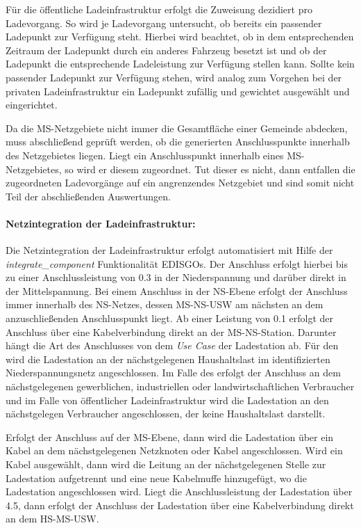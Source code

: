 Für die öffentliche Ladeinfrastruktur erfolgt die Zuweisung dezidiert pro Ladevorgang.
So wird je Ladevorgang untersucht, ob bereits ein passender Ladepunkt zur Verfügung steht.
Hierbei wird beachtet, ob in dem entsprechenden Zeitraum der Ladepunkt durch ein anderes Fahrzeug besetzt ist und ob der Ladepunkt die entsprechende Ladeleistung zur Verfügung stellen kann.
Sollte kein passender Ladepunkt zur Verfügung stehen, wird analog zum Vorgehen bei der privaten Ladeinfrastruktur ein Ladepunkt zufällig und gewichtet ausgewählt und eingerichtet.\medskip

Da die \gls{MS}-Netzgebiete nicht immer die Gesamtfläche einer Gemeinde abdecken, muss abschließend geprüft werden, ob die generierten Anschlusspunkte innerhalb des Netzgebietes liegen.
Liegt ein Anschlusspunkt innerhalb eines \gls{MS}-Netzgebietes, so wird er diesem zugeordnet.
Tut dieser es nicht, dann entfallen die zugeordneten Ladevorgänge auf ein angrenzendes Netzgebiet und sind somit nicht Teil der abschließenden Auswertungen.


\paragraph{Netzintegration der Ladeinfrastruktur:}

Die Netzintegration der Ladeinfrastruktur erfolgt automatisiert mit Hilfe der \textit{integrate\_component} Funktionalität \glspl{EDISGO}.
Der Anschluss erfolgt hierbei bis zu einer Anschlussleistung von \SI{0.3}{\mva} in der Niederspannung und darüber direkt in der Mittelspannung.
Bei einem Anschluss in der \gls{NS}-Ebene erfolgt der Anschluss immer innerhalb des \gls{NS}-Netzes, dessen \gls{MS}-\gls{NS}-\gls{USW} am nächsten an dem anzuschließenden Anschlusspunkt liegt.
Ab einer Leistung von \SI{0.1}{\mva} erfolgt der Anschluss über eine Kabelverbindung direkt an der \gls{MS}-\gls{NS}-Station.
Darunter hängt die Art des Anschlusses von dem \textit{Use Case} der Ladestation ab.
Für den \UC \zH wird die Ladestation an der nächstgelegenen Haushaltslast im identifizierten Niederspannungsnetz angeschlossen.
Im Falle des \UCs \Firmeparkplatz erfolgt der Anschluss an dem nächstgelegenen gewerblichen, industriellen oder landwirtschaftlichen Verbraucher und im Falle von öffentlicher Ladeinfrastruktur wird die Ladestation an den nächstgelegen Verbraucher angeschlossen, der keine Haushaltslast darstellt.\medskip

Erfolgt der Anschluss auf der \gls{MS}-Ebene, dann wird die Ladestation über ein Kabel an dem nächstgelegenen Netzknoten oder Kabel angeschlossen.
Wird ein Kabel ausgewählt, dann wird die Leitung an der nächstgelegenen Stelle zur Ladestation aufgetrennt und eine neue Kabelmuffe hinzugefügt, wo die Ladestation angeschlossen wird.
Liegt die Anschlussleistung der Ladestation über \SI{4.5}{\mva}, dann erfolgt der Anschluss der Ladestation über eine Kabelverbindung direkt an dem \gls{HS}-\gls{MS}-\gls{USW}.\medskip

